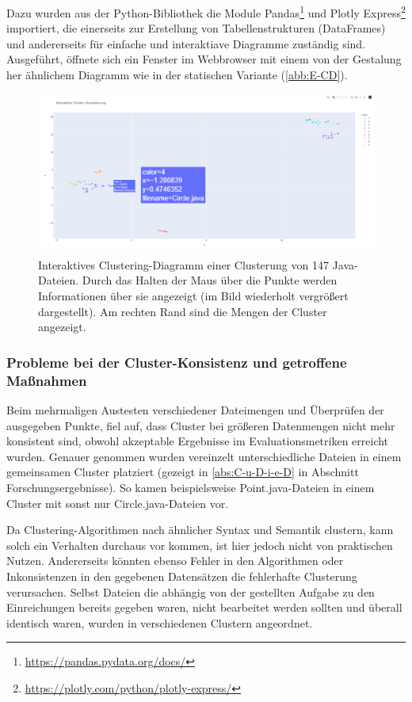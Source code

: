Dazu wurden aus der Python-Bibliothek die Module Pandas\footnote{\url{https://pandas.pydata.org/docs/}} und Plotly Express\footnote{\url{https://plotly.com/python/plotly-express/}} importiert, die einerseits zur Erstellung von Tabellenstrukturen (DataFrames) und andererseits für einfache und interaktiave Diagramme zuständig sind. Ausgeführt, öffnete sich ein Fenster im Webbrowser mit einem von der Gestalung her ähnlichem Diagramm wie in der statischen Variante (\ref{abb:E-CD}).

\begin{figure} %
	\centering
	\includegraphics[width=1.0\textwidth]{images/Interaktives Clustering-Diagramm.pdf}
	\caption{Interaktives Clustering-Diagramm einer Clusterung von 147 Java-Dateien. Durch das Halten der Maus über die Punkte werden Informationen über sie angezeigt (im Bild wiederholt vergrößert dargestellt). Am rechten Rand sind die Mengen der Cluster angezeigt.}
	\label{abb:I-CD}
\end{figure}


\subsubsection*{Probleme bei der Cluster-Konsistenz und getroffene Maßnahmen}
Beim mehrmaligen Austesten verschiedener Dateimengen und Überprüfen der ausgegeben Punkte, fiel auf, dass Cluster bei größeren Datenmengen nicht mehr konsistent sind, obwohl akzeptable Ergebnisse im Evaluationsmetriken erreicht wurden. Genauer genommen wurden vereinzelt unterschiedliche Dateien in einem gemeinsamen Cluster platziert (gezeigt in \ref{abs:C-u-D-i-e-D} in Abschnitt Forschungsergebnisse). So kamen beispielsweise Point.java-Dateien in einem Cluster mit sonst nur Circle.java-Dateien vor.

Da Clustering-Algorithmen nach ähnlicher Syntax und Semantik clustern, kann solch ein Verhalten durchaus vor kommen, ist hier jedoch nicht von praktischen Nutzen. Andererseits könnten ebenso Fehler in den Algorithmen oder Inkonsistenzen in den gegebenen Datensätzen die fehlerhafte Clusterung verursachen. Selbst Dateien die abhängig von der gestellten Aufgabe zu den Einreichungen bereits gegeben waren, nicht bearbeitet werden sollten und überall identisch waren, wurden in verschiedenen Clustern angeordnet.

